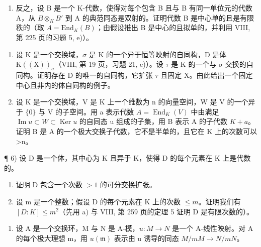 \begin{enumerate}
\def\labelenumi{\alph{enumi})}
\setcounter{enumi}{1}
\tightlist
\item
  反之，设 B 是一个 K-代数，使得对每个包含 B 且与 B 有同一单位元的代数 A，从 \(B \otimes_{K} B'\) 到 A 的典范同态是双射的。证明代数 B 是中心单的且是有限秩的（取 \(A = \text{End}_{K}(B)\)；由假设推出 B 是中心的且拟单的，并利用 VIII, 第 225 页的习题 5, e)）。
\end{enumerate}

\begin{enumerate}
\def\labelenumi{\arabic{enumi})}
\setcounter{enumi}{3}
\item
  设 \(\mathrm{K}\) 是一个交换域，\(\sigma\) 是 \(\mathrm{K}\) 的一个异于恒等映射的自同构，\(\mathrm{D}\) 是体 \(\mathrm{K}((\mathrm{X}))_{\sigma}\)（VIII, 第 19 页，习题 21, e)）。设 \(\tau\) 是 \(\mathrm{K}\) 的一个与 \(\sigma\) 交换的自同构。证明存在 \(\mathrm{D}\) 的唯一的自同构，它扩张 \(\tau\) 且固定 X。由此给出一个固定中心且非内的体自同构的例子。
\item
  设 K 是一个交换域，V 是 K 上一个维数为 n 的向量空间，W 是 V 的一个异于 \(\{0\}\) 与 V 的子空间。用 a 表示代数 \(A = \operatorname{End}_{K}(V)\) 中由满足 \(\operatorname{Im} u \subset W \subset \operatorname{Ker} u\) 的自同态 u 组成的子集，用 B 表示 A 的子代数 \(K + a\)。证明 B 是 A 的一个极大交换子代数，它不是半单的，且它在 K 上的次数可以 \textgreater n。
\end{enumerate}

¶ 6) 设 D 是一个体，其中心为 K 且异于 K，使得 D 的每个元素在 K 上是代数的。

\begin{enumerate}
\def\labelenumi{\alph{enumi})}
\item
  证明 D 包含一个次数 \(>1\) 的可分交换扩张。
\item
  设 m 是一个整数；假设 D 的每个元素在 K 上的次数 \(\leqslant m\)。证明我们有 \([D:K]\leqslant m^{2}\)（先用 a) 与 VIII, 第 259 页的定理 5 证明 D 是有限次数的）。
\end{enumerate}

\begin{enumerate}
\def\labelenumi{\arabic{enumi})}
\setcounter{enumi}{6}
\tightlist
\item
  设 A 是一个交换环，M 与 N 是 A-模，\(u: M \to N\) 是一个 A-线性映射。对 A 的每个极大理想 m，用 \(u(\mathfrak{m})\) 表示由 u 诱导的同态 \(M/mM \to N/mN\)。
\end{enumerate}

